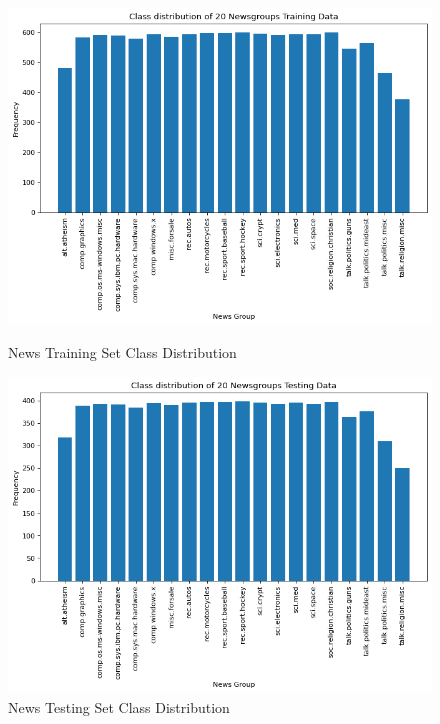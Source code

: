 \documentclass[11pt]{homework}
\begin{document}
\begin{figure}[h!]
  \centering
  \begin{minipage}[h]{0.3\textwidth}
    \includegraphics[width=\textwidth]{news-class-distribution-training.png}
    \caption{News Training Set Class Distribution}\label{news-group-training-class-distribution}
  \end{minipage}
\hspace{1.5cm}
    \begin{minipage}[h]{0.3\textwidth}
    \includegraphics[width=\textwidth]{news-class-distribution-testing.png}
    \caption{News Testing Set Class Distribution}\label{news-group-testing-class-distribution}
  \end{minipage}
\end{figure}
\end{document}
